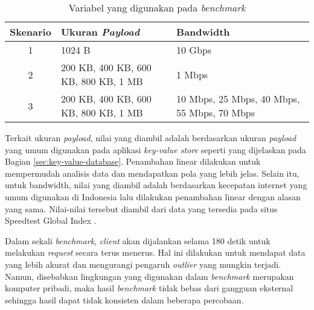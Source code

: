 \begin{table}[ht]
	\centering
	\caption{Variabel yang digunakan pada \textit{benchmark}}
	\label{tab:variabel-benchmark}
	\begin{tabular}{|c|p{5.5cm}|p{5.5cm}|}
		\hline
		\textbf{Skenario} & \textbf{Ukuran \textit{Payload}}     & \textbf{Bandwidth}                          \\ \hline
		1                 & 1024 B                               & 10 Gbps                                     \\ \hline
		2                 & 200 KB, 400 KB, 600 KB, 800 KB, 1 MB & 1 Mbps                                      \\ \hline
		3                 & 200 KB, 400 KB, 600 KB, 800 KB, 1 MB & 10 Mbps, 25 Mbps, 40 Mbps, 55 Mbps, 70 Mbps \\ \hline
	\end{tabular}
\end{table}

Terkait ukuran \textit{payload}, nilai yang diambil adalah berdasarkan ukuran \textit{payload} yang umum digunakan pada aplikasi \textit{key-value store} seperti yang dijelaskan pada Bagian \ref{sec:key-value-database}. Penambahan linear dilakukan untuk mempermudah analisis data dan mendapatkan pola yang lebih jelas. Selain itu, untuk bandwidth, nilai yang diambil adalah berdasarkan kecepatan internet yang umum digunakan di Indonesia lalu dilakukan penambahan linear dengan alasan yang sama. Nilai-nilai tersebut diambil dari data yang tersedia pada situs Speedtest Global Index \cite{ookla2025speedtest}.

Dalam sekali \textit{benchmark}, \textit{client} akan dijalankan selama 180 detik untuk melakukan \textit{request} secara terus menerus. Hal ini dilakukan untuk mendapat data yang lebih akurat dan mengurangi pengaruh \textit{outlier} yang mungkin terjadi. Namun, disebabkan lingkungan yang digunakan dalam \textit{benchmark} merupakan komputer pribadi, maka hasil \textit{benchmark} tidak bebas dari gangguan eksternal sehingga hasil dapat tidak konsisten dalam beberapa percobaan.